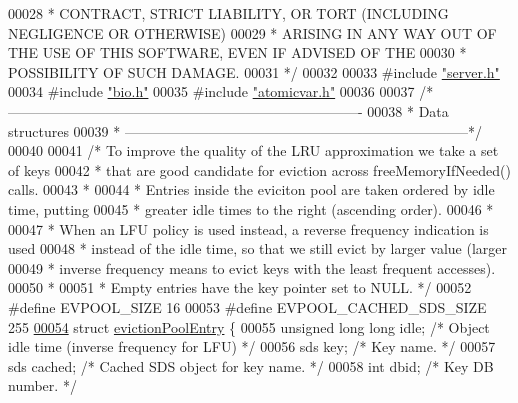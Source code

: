 \begin{DoxyCode}
00028 \textcolor{comment}{ * CONTRACT, STRICT LIABILITY, OR TORT (INCLUDING NEGLIGENCE OR OTHERWISE)}
00029 \textcolor{comment}{ * ARISING IN ANY WAY OUT OF THE USE OF THIS SOFTWARE, EVEN IF ADVISED OF THE}
00030 \textcolor{comment}{ * POSSIBILITY OF SUCH DAMAGE.}
00031 \textcolor{comment}{ */}
00032 
00033 \textcolor{preprocessor}{#}\textcolor{preprocessor}{include} \hyperlink{server_8h}{"server.h"}
00034 \textcolor{preprocessor}{#}\textcolor{preprocessor}{include} \hyperlink{bio_8h}{"bio.h"}
00035 \textcolor{preprocessor}{#}\textcolor{preprocessor}{include} \hyperlink{atomicvar_8h}{"atomicvar.h"}
00036 
00037 \textcolor{comment}{/* ----------------------------------------------------------------------------}
00038 \textcolor{comment}{ * Data structures}
00039 \textcolor{comment}{ * --------------------------------------------------------------------------*/}
00040 
00041 \textcolor{comment}{/* To improve the quality of the LRU approximation we take a set of keys}
00042 \textcolor{comment}{ * that are good candidate for eviction across freeMemoryIfNeeded() calls.}
00043 \textcolor{comment}{ *}
00044 \textcolor{comment}{ * Entries inside the eviciton pool are taken ordered by idle time, putting}
00045 \textcolor{comment}{ * greater idle times to the right (ascending order).}
00046 \textcolor{comment}{ *}
00047 \textcolor{comment}{ * When an LFU policy is used instead, a reverse frequency indication is used}
00048 \textcolor{comment}{ * instead of the idle time, so that we still evict by larger value (larger}
00049 \textcolor{comment}{ * inverse frequency means to evict keys with the least frequent accesses).}
00050 \textcolor{comment}{ *}
00051 \textcolor{comment}{ * Empty entries have the key pointer set to NULL. */}
00052 \textcolor{preprocessor}{#}\textcolor{preprocessor}{define} \textcolor{preprocessor}{EVPOOL\_SIZE} 16
00053 \textcolor{preprocessor}{#}\textcolor{preprocessor}{define} \textcolor{preprocessor}{EVPOOL\_CACHED\_SDS\_SIZE} 255
\hyperlink{structevictionPoolEntry}{00054} \textcolor{keyword}{struct} \hyperlink{structevictionPoolEntry}{evictionPoolEntry} \{
00055     \textcolor{keywordtype}{unsigned} \textcolor{keywordtype}{long} \textcolor{keywordtype}{long} idle;    \textcolor{comment}{/* Object idle time (inverse frequency for LFU) */}
00056     sds key;                    \textcolor{comment}{/* Key name. */}
00057     sds cached;                 \textcolor{comment}{/* Cached SDS object for key name. */}
00058     \textcolor{keywordtype}{int} dbid;                   \textcolor{comment}{/* Key DB number. */}

\end{DoxyCode}
